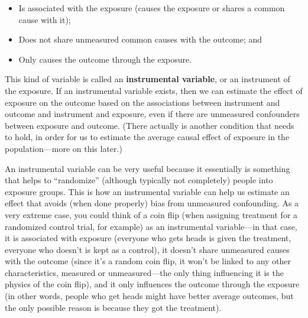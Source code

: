 \documentclass[
]{book}
\providecommand{\tightlist}{%
  \setlength{\itemsep}{0pt}\setlength{\parskip}{0pt}}
\begin{document}
\begin{itemize}
\tightlist
\item
  Is associated with the exposure (causes the exposure or shares a common cause with it);
\item
  Does not share unmeasured common causes with the outcome; and
\item
  Only causes the outcome through the exposure.
\end{itemize}

This kind of variable is called an \textbf{instrumental variable}, or an instrument of the exposure.
If an instrumental variable exists, then we can estimate the effect of exposure on the
outcome based on the associations between instrument and outcome and instrument
and exposure, even if there are unmeasured confounders between exposure and outcome.
(There actually is another condition that needs to hold, in order for us to estimate
the average causal effect of exposure in the population---more on this later.)

An instrumental variable can be very useful because it essentially is something
that helps to ``randomize'' (although typically not completely) people into
exposure groups. This is how an instrumental variable can help us estimate an
effect that avoids (when done properly) bias from unmeasured confounding. As
a very extreme case, you could think of a coin flip (when assigning treatment
for a randomized control trial, for example) as an instrumental variable---in
that case, it is associated with exposure (everyone who gets heads is given
the treatment, everyone who doesn't is kept as a control), it doesn't share
unmeasured causes with the outcome (since it's a random coin flip, it won't
be linked to any other characteristics, measured or unmeasured---the only thing
influencing it is the physics of the coin flip), and it only influences the
outcome through the exposure (in other words, people who get heads might
have better average outcomes, but the only possible reason is because they
got the treatment).
\end{document}
